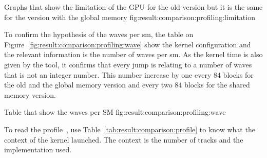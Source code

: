 {Graphs that show the limitation of the GPU for the old version but it is the
same for the version with the global memory}
{fig:result:comparison:profiling:limitation}

To confirm the hypothesis of the waves per \acrshort{sm}, the table on
Figure~\ref{fig:result:comparison:profiling:wave} show the kernel configuration
and the relevant information is the number of waves per \acrshort{sm}.
As the kernel time is also given by the tool, it confirms that every jump is
relating to a number of waves that is not an integer number.
This number increase by one every 84 blocks for the old and the global memory
version and every two 84 blocks for the shared memory version.

{Table that show the waves per SM}
{fig:result:comparison:profiling:wave}

To read the profile~\cite{nsight-profile}, use Table~\ref{tab:result:comparison:profile} to know
what the context of the kernel launched.
The context is the number of tracks and the implementation used.

